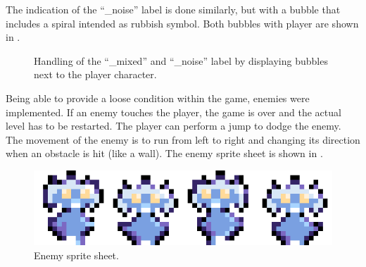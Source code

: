 The indication of the \enquote{\_noise} label is done similarly, but with a bubble that includes a spiral intended as rubbish symbol.
Both bubbles with player are shown in .
\begin{figure}[!ht]
  \centering
  \hspace{2cm}
  \caption{Handling of the \enquote{\_mixed} and \enquote{\_noise} label by displaying bubbles next to the player character.}
  \label{fig:game_design_mechanic_bubble}
\end{figure}
\FloatBarrier
\noindent

Being able to provide a loose condition within the game, enemies were implemented.
If an enemy touches the player, the game is over and the actual level has to be restarted.
The player can perform a jump to dodge the enemy.
The movement of the enemy is to run from left to right and changing its direction when an obstacle is hit (like a wall).
The enemy sprite sheet is shown in .
\begin{figure}[!ht]
  \centering
  \includegraphics[height=0.07\textwidth]{./6_game/figs/game_design_mechanic_enemy}
  \caption{Enemy sprite sheet.}
  \label{fig:game_design_mechanic_enemy}
\end{figure}
\FloatBarrier
\noindent



